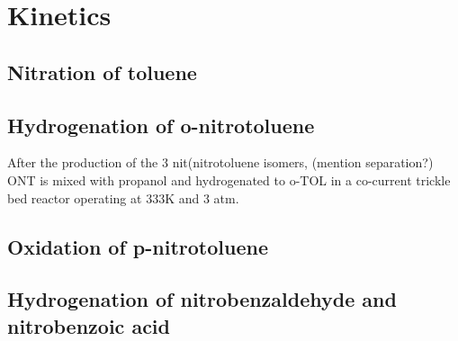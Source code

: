 \section{Kinetics}
\subsection{Nitration of toluene}
\subsection{Hydrogenation of o-nitrotoluene}
After the production of the 3 nit(nitrotoluene isomers, (mention separation?) ONT is mixed with propanol and hydrogenated to o-TOL in a co-current trickle bed reactor operating at 333K and 3 atm. 

\s
\subsection{Oxidation of p-nitrotoluene}
\subsection{Hydrogenation of nitrobenzaldehyde and nitrobenzoic acid}